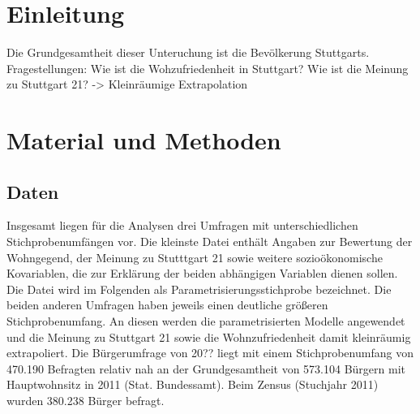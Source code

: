 \documentclass{Vorlage}
\begin{document}
\restoregeometry


\pagestyle{plain}

\tableofcontents %

\newpage %

\listoffigures %

\listoftables %

\newpage



\pagestyle{fancy}

\section{Einleitung}
Die Grundgesamtheit dieser Unteruchung ist die Bevölkerung Stuttgarts.
Fragestellungen: Wie ist die Wohzufriedenheit in Stuttgart? Wie ist die Meinung zu Stuttgart 21? -> Kleinräumige Extrapolation


\newpage

\section{Material und Methoden}
\subsection{Daten}
Insgesamt liegen für die Analysen drei Umfragen mit unterschiedlichen Stichprobenumfängen vor. Die kleinste Datei enthält Angaben zur Bewertung der Wohngegend, der Meinung zu Stutttgart 21 sowie weitere sozioökonomische Kovariablen, die zur Erklärung der beiden abhängigen Variablen dienen sollen. Die Datei wird im Folgenden als Parametrisierungsstichprobe bezeichnet. Die beiden anderen Umfragen haben jeweils einen deutliche größeren Stichprobenumfang. An diesen werden die parametrisierten Modelle angewendet und die Meinung zu Stuttgart 21 sowie die Wohnzufriedenheit damit kleinräumig extrapoliert. Die Bürgerumfrage von 20?? liegt mit einem Stichprobenumfang von 470.190 Befragten relativ nah an der Grundgesamtheit von 573.104 Bürgern mit Hauptwohnsitz in 2011 (Stat. Bundessamt). Beim Zensus (Stuchjahr 2011) wurden 380.238 Bürger befragt.
\end{document}
